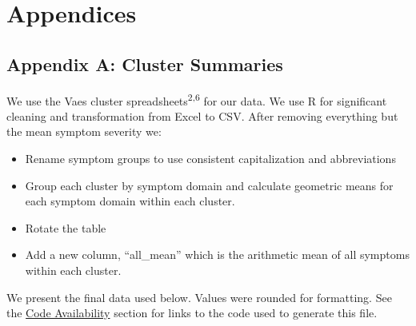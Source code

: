 \documentclass[
  letterpaper,
  DIV=11,
  numbers=noendperiod]{scrartcl}
\providecommand{\tightlist}{%
  \setlength{\itemsep}{0pt}\setlength{\parskip}{0pt}}
\begin{document}
\clearpage

\section{Appendices}\label{appendices}

\FloatBarrier

\subsection*{Appendix A: Cluster Summaries}\label{sec-cluster-data}

We use the Vaes cluster spreadsheets\textsuperscript{2,6} for our data.
We use R for significant cleaning and transformation from Excel to CSV.
After removing everything but the mean symptom severity we:

\begin{itemize}
\tightlist
\item
  Rename symptom groups to use consistent capitalization and
  abbreviations
\item
  Group each cluster by symptom domain and calculate geometric means for
  each symptom domain within each cluster.
\item
  Rotate the table
\item
  Add a new column, ``all\_mean'' which is the arithmetic mean of all
  symptoms within each cluster.
\end{itemize}

We present the final data used below. Values were rounded for
formatting. See the \hyperref[sec-code]{Code Availability} section for
links to the code used to generate this file.
\end{document}
